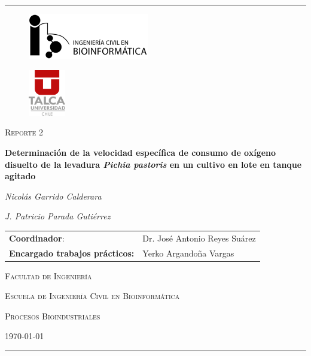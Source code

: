\documentclass[a4paper,12pt]{article}
\begin{document}
  \begin{titlepage}
    \centering
    \rule[1ex]{\textwidth}{0.8pt}

    \vspace{1cm}
    \begin{minipage}[b]{.45\linewidth}
      \begin{figure}[H]
        \raggedright
        \includegraphics[height=2.0cm]{icb_logo}
      \end{figure}
    \end{minipage}
    \begin{minipage}[b]{.45\linewidth}
      \begin{figure}[H]
        \raggedleft
        \includegraphics[height=2.0cm]{utalca_logo}
      \end{figure}
    \end{minipage}

    \vspace{2cm}

    {\large \scshape Reporte 2 \par}

    \vspace{1cm}
    {\Large \bfseries Determinación de la velocidad específica de consumo de oxígeno disuelto de la levadura \emph{Pichia pastoris} en un cultivo en lote en tanque agitado \par}

    \vspace{2cm}
    {\itshape Nicolás Garrido Calderara \par}
    {\itshape J. Patricio Parada Gutiérrez \par}
    \vspace{2cm}

    \begin{tabular}{ll}
      \textbf{Coordinador}: & Dr. José Antonio Reyes Suárez \\
      \textbf{Encargado trabajos prácticos:} & Yerko Argandoña Vargas \\
    \end{tabular}

    \vfill
    {\scshape Facultad de Ingeniería \par}
    {\scshape Escuela de Ingeniería Civil en Bioinformática \par}
    {\scshape Procesos Bioindustriales \par}

    \vfill
    {\scshape \today \par}

    \vfill
    \rule{\textwidth}{0.8pt}

  \end{titlepage}
\end{document}
